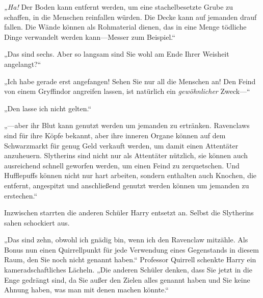 \emph{„Ha!} Der Boden kann entfernt werden, um eine stachelbesetzte Grube zu schaffen, in die Menschen reinfallen würden. Die Decke kann auf jemanden drauf fallen. Die Wände können als Rohmaterial dienen, das in eine Menge tödliche Dinge verwandelt werden kann—Messer zum Beispiel.“

„Das sind sechs. Aber so langsam sind Sie wohl am Ende Ihrer Weisheit angelangt?“

„Ich habe gerade erst angefangen! Sehen Sie nur all die Menschen an! Den Feind von einem Gryffindor angreifen lassen, ist natürlich ein \emph{gewöhnlicher} Zweck—“

„Den lasse ich nicht gelten.“

„—aber ihr Blut kann genutzt werden um jemanden zu ertränken. Ravenclaws sind für ihre Köpfe bekannt, aber ihre inneren Organe können auf dem Schwarzmarkt für genug Geld verkauft werden, um damit einen Attentäter anzuheuern. Slytherins sind nicht nur als Attentäter nützlich, sie können auch ausreichend schnell geworfen werden, um einen Feind zu zerquetschen. Und Hufflepuffs können nicht nur hart arbeiten, sondern enthalten auch Knochen, die entfernt, angespitzt und anschließend genutzt werden können um jemanden zu erstechen.“

Inzwischen starrten die anderen Schüler Harry entsetzt an. Selbst die Slytherins sahen schockiert aus.

„Das sind zehn, obwohl ich gnädig bin, wenn ich den Ravenclaw mitzähle. Als Bonus nun einen Quirrellpunkt für jede Verwendung eines Gegenstands in diesem Raum, den Sie noch nicht genannt haben.“ Professor Quirrell schenkte Harry ein kameradschaftliches Lächeln. „Die anderen Schüler denken, dass Sie jetzt in die Enge gedrängt sind, da Sie außer den Zielen alles genannt haben und Sie keine Ahnung haben, was man mit denen machen könnte.“

